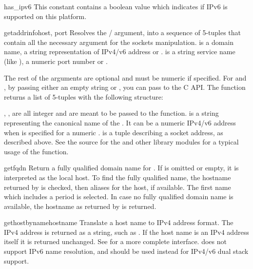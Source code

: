 \begin{datadesc}{has_ipv6}
This constant contains a boolean value which indicates if IPv6 is
supported on this platform.
\end{datadesc}

\begin{funcdesc}{getaddrinfo}{host, port}
Resolves the / argument, into a sequence of
5-tuples that contain all the necessary argument for the sockets
manipulation.  is a domain name, a string representation of
IPv4/v6 address or .
 is a string service name (like ), a numeric
port number or .

The rest of the arguments are optional and must be numeric if
specified.  For  and , by passing either an empty
string or , you can pass  to the C API.  The
 function returns a list of 5-tuples with
the following structure:


, ,  are all integer and are meant to
be passed to the  function.
 is a string representing the canonical name of the .
It can be a numeric IPv4/v6 address when  is specified
for a numeric .
 is a tuple describing a socket address, as described above.
See the source for the  and other library modules
for a typical usage of the function.
\end{funcdesc}

\begin{funcdesc}{getfqdn}{}
Return a fully qualified domain name for .
If  is omitted or empty, it is interpreted as the local
host.  To find the fully qualified name, the hostname returned by
 is checked, then aliases for the host, if
available.  The first name which includes a period is selected.  In
case no fully qualified domain name is available, the hostname as
returned by  is returned.
\end{funcdesc}

\begin{funcdesc}{gethostbyname}{hostname}
Translate a host name to IPv4 address format.  The IPv4 address is
returned as a string, such as  .  If the host name
is an IPv4 address itself it is returned unchanged.  See
 for a more complete interface.
 does not support IPv6 name resolution, and
 should be used instead for IPv4/v6 dual stack support.
\end{funcdesc}

